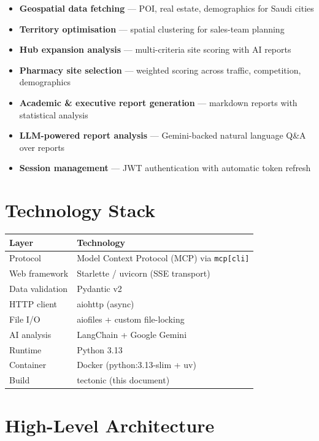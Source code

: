 \documentclass[12pt,a4paper]{report}
\begin{document}
\begin{itemize}[noitemsep]
  \item \textbf{Geospatial data fetching} --- POI, real estate, demographics for Saudi cities
  \item \textbf{Territory optimisation} --- spatial clustering for sales-team planning
  \item \textbf{Hub expansion analysis} --- multi-criteria site scoring with AI reports
  \item \textbf{Pharmacy site selection} --- weighted scoring across traffic, competition, demographics
  \item \textbf{Academic \& executive report generation} --- markdown reports with statistical analysis
  \item \textbf{LLM-powered report analysis} --- Gemini-backed natural language Q\&A over reports
  \item \textbf{Session management} --- JWT authentication with automatic token refresh
\end{itemize}

\section{Technology Stack}

\begin{center}
\begin{tabularx}{\linewidth}{lX}
  \toprule
  \textbf{Layer} & \textbf{Technology} \\
  \midrule
  Protocol & Model Context Protocol (MCP) via \texttt{mcp[cli]} \\
  Web framework & Starlette / uvicorn (SSE transport) \\
  Data validation & Pydantic v2 \\
  HTTP client & aiohttp (async) \\
  File I/O & aiofiles + custom file-locking \\
  AI analysis & LangChain + Google Gemini \\
  Runtime & Python 3.13 \\
  Container & Docker (python:3.13-slim + uv) \\
  Build & tectonic (this document) \\
  \bottomrule
\end{tabularx}
\end{center}

\section{High-Level Architecture}
\end{document}
